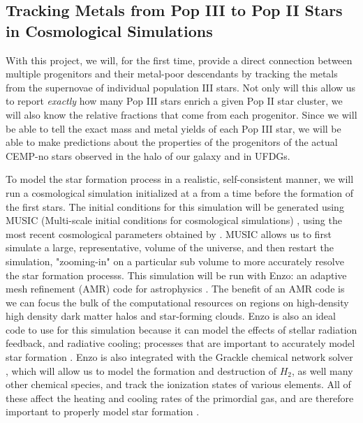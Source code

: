 \documentclass[a4paper, 12pt]{article}
\begin{document}
\subsection{Tracking Metals from Pop III to Pop II Stars in Cosmological Simulations}
\label{subsec:tracer_particles}

With this project, we will, for the first time, provide a direct connection between multiple progenitors and their metal-poor descendants by tracking the metals from the supernovae of individual population III stars. Not only will this allow us to report \textit{exactly} how many Pop III stars enrich a given Pop II star cluster, we will also know the relative fractions that come from each progenitor. Since we will be able to tell the exact mass and metal yields of each Pop III star, we will be able to make predictions about the properties of the progenitors of the actual CEMP-no stars observed in the halo of our galaxy and in UFDGs. 

To model the star formation process in a realistic, self-consistent manner, we will run a cosmological simulation initialized at a from a time before the formation of the first stars. The initial conditions for this simulation will be generated using MUSIC (Multi-scale initial conditions for cosmological simulations) \citep{Hahn2011}, using the most recent cosmological parameters obtained by \cite{Planck2018}. MUSIC allows us to first simulate a large, representative, volume of the universe, and then restart the simulation, "zooming-in" on a particular sub volume to more accurately resolve the star formation processs. This simulation will be run with Enzo: an adaptive mesh refinement (AMR) code for astrophysics \citep{Bryan2014}. The benefit of an AMR code is we can focus the bulk of the computational resources on regions on high-density high density dark matter halos and star-forming clouds. Enzo is also an ideal code to use for this simulation because it can model the effects of stellar radiation feedback, and radiative cooling; processes that are important to accurately model star formation \citep{...}. Enzo is also integrated with the Grackle chemical network solver \citep{...}, which will allow us to model the formation and destruction of $H_2$, as well many other chemical species, and track the ionization states of various elements. All of these affect the heating and cooling rates of the primordial gas, and are therefore important to properly model star formation \citep{...}.
\end{document}

